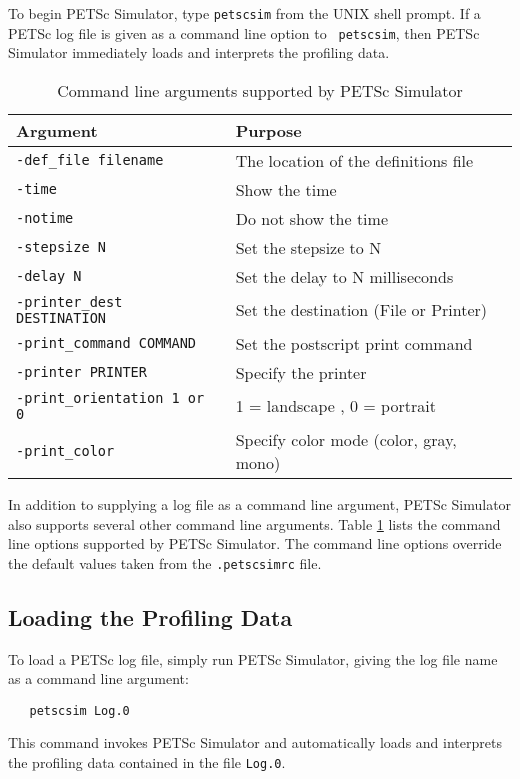 To begin PETSc Simulator, type {\tt petscsim} from the UNIX shell
prompt.  If a PETSc log file is given as a command line option to {\tt
petscsim}, then PETSc Simulator immediately loads and interprets the
profiling data.

\begin{table}
\begin{tabular}{||l||l||} \hline
{\bf Argument}                  & {\bf Purpose} \\ \hline
{\tt -def\_file filename}       & The location of the definitions file \\ \hline
{\tt -time}                    & Show the time \\ \hline
{\tt -notime}                  & Do not show the time \\ \hline
{\tt -stepsize N}              & Set the stepsize to N \\ \hline
{\tt -delay N}                 & Set the delay to N milliseconds \\ \hline 
{\tt -printer\_dest DESTINATION}& Set the destination (File or Printer) \\ \hline
{\tt -print\_command COMMAND}   & Set the postscript print command \\ \hline
{\tt -printer PRINTER}         & Specify the printer \\ \hline
{\tt -print\_orientation 1 or 0}& 1 = landscape , 0 = portrait \\ \hline
{\tt -print\_color}             & Specify color mode (color, gray, mono) \\ \hline
\end{tabular}
\label{PETSc Simulator command line options}
\caption{Command line arguments supported by PETSc Simulator}
\end{table}

In addition to supplying a log file as a command line argument, PETSc
Simulator also supports several other command line arguments.  Table
\ref{PETSc Simulator command line options} lists the command line
options supported by PETSc Simulator.  The command line options
override the default values taken from the {\tt .petscsimrc} file.

\subsection{Loading the Profiling Data}

To load a PETSc log file, simply run PETSc Simulator, giving the log 
file name as a command line argument:
\begin{verbatim}
   petscsim Log.0
\end{verbatim}
This command invokes PETSc Simulator and automatically loads and
interprets the profiling data contained in the file {\tt Log.0}.

